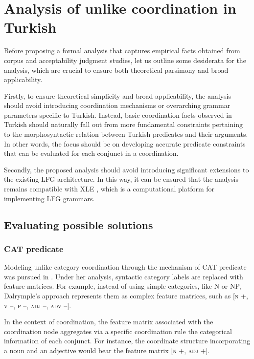 \section{Analysis of unlike coordination in Turkish} \label{sec:lfganalysis}

Before proposing a formal analysis that captures empirical facts obtained from corpus and acceptability judgment studies, let us outline some desiderata for the analysis, which are crucial to ensure both theoretical parsimony and broad applicability.

Firstly, to ensure theoretical simplicity and broad applicability, the analysis should avoid introducing coordination mechanisms or overarching grammar parameters specific to Turkish. Instead, basic coordination facts observed in Turkish should naturally fall out from more fundamental constraints pertaining to the morphosyntactic relation between Turkish predicates and their arguments. In other words, the focus should be on developing accurate predicate constraints that can be evaluated for each conjunct in a coordination.

Secondly, the proposed analysis should avoid introducing significant extensions to the existing LFG architecture. In this way, it can be ensured that the analysis remains compatible with XLE \citep[Xerox Linguistic Environment;][]{xle}, which is a computational platform for implementing LFG grammars.

\subsection{Evaluating possible solutions}
\subsubsection{CAT predicate}

Modeling unlike category coordination through the mechanism of CAT predicate was pursued in \citet{Dalrymple2017}. Under her analysis, syntactic category labels are replaced with feature matrices. For example, instead of using simple categories, like N or NP, Dalrymple's approach represents them as complex feature matrices, such as [\textsc{n} +, \textsc{v} --, \textsc{p} --, \textsc{adj} --, \textsc{adv} --].

In the context of coordination, the feature matrix associated with the coordination node aggregates via a specific coordination rule the categorical information of each conjunct. For instance, the coordinate structure incorporating a noun and an adjective would bear the feature matrix [\textsc{n} +, \textsc{adj} +]. 

